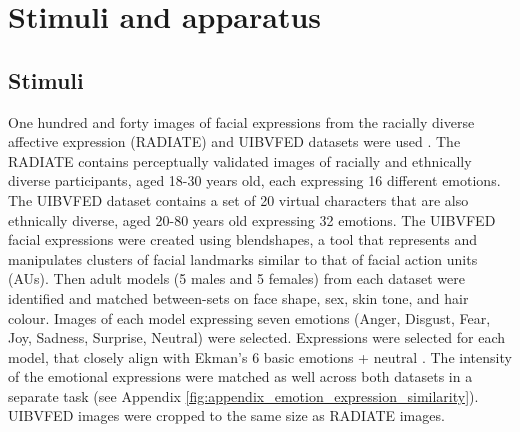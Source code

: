 \section{Stimuli and apparatus}
\subsection{Stimuli}
One hundred and forty images of facial expressions from the racially diverse affective expression (RADIATE) and UIBVFED datasets were used \citep{conley_racially_2018, oliver_uibvfed_2020}.
The RADIATE contains perceptually validated images of racially and ethnically diverse participants, aged 18-30 years old, each expressing 16 different emotions. 
The UIBVFED dataset contains a set of 20 virtual characters that are also ethnically diverse, aged 20-80 years old expressing 32 emotions. 
The UIBVFED facial expressions were created using blendshapes, a tool that represents and manipulates clusters of facial landmarks similar to that of facial action units (AUs).
Then adult models (5 males and 5 females) from each dataset were identified and matched between-sets on face shape, sex, skin tone, and hair colour. 
Images of each model expressing seven emotions (Anger, Disgust, Fear, Joy, Sadness, Surprise, Neutral) were selected. 
Expressions were selected for each model, that closely align with Ekman's 6 basic emotions + neutral \citep{ekman1971constants}.
The intensity of the emotional expressions were matched as well across both datasets in a separate task (see Appendix \ref{fig:appendix_emotion_expression_similarity}).
UIBVFED images were cropped to the same size as RADIATE images. 

